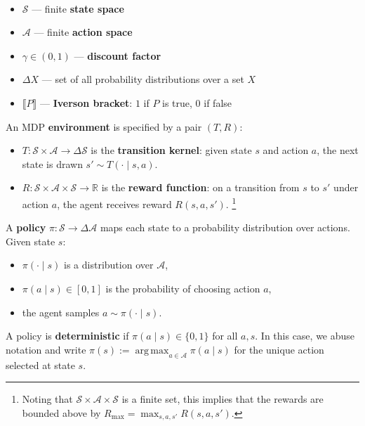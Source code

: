 \documentclass[11pt]{article}
\newcommand{\cS}{\mathcal{S}}
\newcommand{\cA}{\mathcal{A}}
\DeclareMathOperator*{\argmax}{arg\,max}
\begin{document}

\begin{definition}\label{def:spaces}\
\begin{itemize}\itemsep=2pt
    \item $\cS$ --- finite \textbf{state space}
    \item $\cA$ --- finite \textbf{action space}
    \item $\gamma \in (0, 1)$ --- \textbf{discount factor}
    \item $\Delta X$ --- set of all probability distributions over a set $X$
    \item $\llbracket P \rrbracket$ --- \textbf{Iverson bracket}: $1$ if $P$ is true, $0$ if false
\end{itemize}
\end{definition}

\begin{definition}[Environment]\label{def:environment}
An MDP \textbf{environment} is specified by a pair $(T, R)$:
\begin{itemize}\itemsep=2pt
    \item $T : \cS \times \cA \to \Delta \cS$ is the \textbf{transition kernel}: given state $s$ and action $a$, the next state is drawn $s' \sim T(\cdot \mid s, a)$.
    \item $R : \cS \times \cA \times \cS \to \mathbb{R}$ is the \textbf{reward function}: on a transition from $s$ to $s'$ under action $a$, the agent receives reward $R(s, a, s')$.
    \footnote{Noting that $\cS \times \cA \times \cS$ is a finite set, this implies that the rewards are bounded above by $R_\text{max} = \max_{s,a,s'} R(s,a,s')$.}
\end{itemize}
\end{definition}

\begin{definition}[Policy]\label{def:policy}
A \textbf{policy} $\pi : \cS \to \Delta \cA$ maps each state to a probability distribution over actions. Given state $s$:
\begin{itemize}\itemsep=2pt
    \item $\pi(\cdot \mid s)$ is a distribution over $\cA$,
    \item $\pi(a \mid s) \in [0, 1]$ is the probability of choosing action $a$,
    \item the agent samples $a \sim \pi(\cdot \mid s)$.
\end{itemize}
A policy is \textbf{deterministic} if $\pi(a \mid s) \in \{0, 1\}$ for all $a, s$. In this case, we abuse notation and write $\pi(s) := \argmax_{a \in \cA} \pi(a \mid s)$ for the unique action selected at state $s$.
\end{definition}
\end{document}
